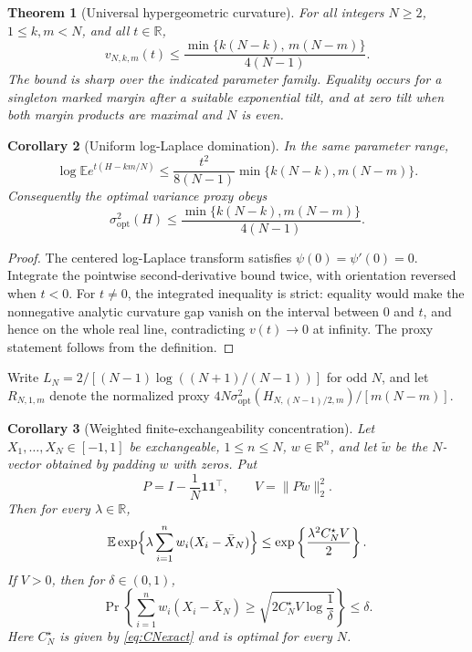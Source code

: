 \documentclass[11pt,a4paper]{article}
\newtheorem{theorem}{Theorem}[section]
\newtheorem{corollary}[theorem]{Corollary}
\newcommand{\E}{\mathbb E}\newcommand{\R}{\mathbb R}\newcommand{\N}{\mathbb N}\newcommand{\one}{\mathbf1}
\begin{document}
\begin{theorem}[Universal hypergeometric curvature]\label{thm:curvature}
For all integers $N\ge2$, $1\le k,m<N$, and all $t\in\R$,
\begin{equation}\label{eq:curvature}
 \boxed{\quad v_{N,k,m}(t)\le
 \frac{\min\{k(N-k),\,m(N-m)\}}{4(N-1)}.\quad}
\end{equation}
The bound is sharp over the indicated parameter family. Equality occurs for a singleton marked margin after a suitable exponential tilt, and at zero tilt when both margin products are maximal and $N$ is even.
\end{theorem}

\begin{corollary}[Uniform log-Laplace domination]\label{cor:mgf}
In the same parameter range,
\begin{equation}\label{eq:mgf}
 \log\E e^{t(H-km/N)}\le
 \frac{t^2}{8(N-1)}\min\{k(N-k),m(N-m)\}.
\end{equation}
Consequently the optimal variance proxy obeys
\begin{equation}\label{eq:proxy}
 \sigma^2_{\mathrm{opt}}(H)\le
 \frac{\min\{k(N-k),m(N-m)\}}{4(N-1)}.
\end{equation}
\end{corollary}
\begin{proof}
The centered log-Laplace transform satisfies $\psi(0)=\psi'(0)=0$. Integrate the pointwise second-derivative bound twice, with orientation reversed when $t<0$. For $t\ne0$, the integrated inequality is strict: equality would make the nonnegative analytic curvature gap vanish on the interval between $0$ and $t$, and hence on the whole real line, contradicting $v(t)\to0$ at infinity. The proxy statement follows from the definition.
\end{proof}


Write $L_N=2/[(N-1)\log((N+1)/(N-1))]$ for odd $N$, and let $R_{N,1,m}$ denote the normalized proxy $4N\sigma^2_{\mathrm{opt}}(H_{N,(N-1)/2,m})/[m(N-m)]$.
\begin{corollary}[Weighted finite-exchangeability concentration]\label{cor:tail}
Let $X_1,\ldots,X_N\in[-1,1]$ be exchangeable, $1\le n\le N$, $w\in\R^n$, and let $\widetilde w$ be the $N$-vector obtained by padding $w$ with zeros. Put
\[
 P=I-\frac1N\one\one^\top,\qquad V=\|P\widetilde w\|_2^2.
\]
Then for every $\lambda\in\R$,
\[
 \E\exp\Bigl\{\lambda\sum_{i=1}^nw_i(X_i-\bar X_N)\Bigr\}
 \le\exp\left\{\frac{\lambda^2C_N^\star V}{2}\right\}.
\]
If $V>0$, then for $\delta\in(0,1)$,
\[
 \Pr\left\{\sum_{i=1}^nw_i(X_i-\bar X_N)\ge
 \sqrt{2C_N^\star V\log\frac1\delta}\right\}\le\delta.
\]
Here $C_N^\star$ is given by \eqref{eq:CNexact} and is optimal for every $N$.
\end{corollary}
\end{document}

